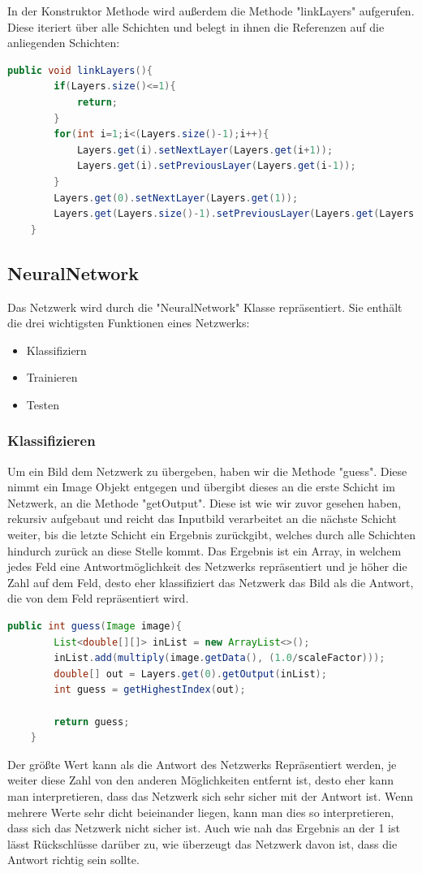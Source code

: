 \documentclass[12pt]{article}
\begin{document}
In der Konstruktor Methode wird außerdem die Methode "linkLayers" aufgerufen. Diese iteriert über alle Schichten und belegt in ihnen die Referenzen auf die anliegenden Schichten:
\begin{lstlisting}[language=Java]
    public void linkLayers(){
        if(Layers.size()<=1){
            return;
        }
        for(int i=1;i<(Layers.size()-1);i++){
            Layers.get(i).setNextLayer(Layers.get(i+1));
            Layers.get(i).setPreviousLayer(Layers.get(i-1));
        }
        Layers.get(0).setNextLayer(Layers.get(1));
        Layers.get(Layers.size()-1).setPreviousLayer(Layers.get(Layers.size()-2));
    }
\end{lstlisting}

\subsection{NeuralNetwork}
Das Netzwerk wird durch die "NeuralNetwork" Klasse repräsentiert. Sie enthält die drei wichtigsten Funktionen eines Netzwerks:
\begin{itemize}
  \item Klassifiziern
  \item Trainieren
  \item Testen
\end{itemize}

\subsubsection{Klassifizieren}

Um ein Bild dem Netzwerk zu übergeben, haben wir die Methode "guess". Diese nimmt ein Image Objekt entgegen und übergibt dieses an die erste Schicht im Netzwerk, an die Methode "getOutput". Diese ist wie wir zuvor gesehen haben, rekursiv aufgebaut und reicht das Inputbild verarbeitet an die nächste Schicht weiter, bis die letzte Schicht ein Ergebnis zurückgibt, welches durch alle Schichten hindurch zurück an diese Stelle kommt. Das Ergebnis ist ein Array, in welchem jedes Feld eine Antwortmöglichkeit des Netzwerks repräsentiert und je höher die Zahl auf dem Feld, desto eher klassifiziert das Netzwerk das Bild als die Antwort, die von dem Feld repräsentiert wird.
\begin{lstlisting}[language=Java]
public int guess(Image image){
        List<double[][]> inList = new ArrayList<>();
        inList.add(multiply(image.getData(), (1.0/scaleFactor)));
        double[] out = Layers.get(0).getOutput(inList);
        int guess = getHighestIndex(out);
        
        return guess;
    }
\end{lstlisting}
Der größte Wert kann als die Antwort des Netzwerks Repräsentiert werden, je weiter diese Zahl von den anderen Möglichkeiten entfernt ist, desto eher kann man interpretieren, dass das Netzwerk sich sehr sicher mit der Antwort ist. Wenn mehrere Werte sehr dicht beieinander liegen, kann man dies so interpretieren, dass sich das Netzwerk nicht sicher ist. Auch wie nah das Ergebnis an der 1 ist lässt Rückschlüsse darüber zu, wie überzeugt das Netzwerk davon ist, dass die Antwort richtig sein sollte.
\end{document}
